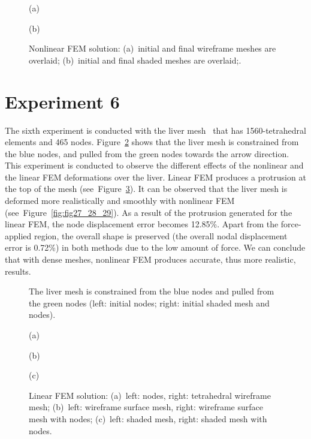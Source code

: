 \begin{figure}[h]
\centerline{}
\centerline{(a)}
\centerline{}
\centerline{(b)}
\caption{Nonlinear FEM solution: (a)~initial and final wireframe meshes are overlaid; (b)~initial and final shaded meshes are overlaid;.}
\label{fig:fig21_22}
\end{figure}

\clearpage
\section{Experiment 6}
\label{vi}

The sixth experiment is conducted with the liver mesh~\cite{Liver2011} that has 1560-tetrahedral elements and 465 nodes. Figure~\ref{fig:fig23} shows that the liver mesh is constrained from the blue nodes, and pulled from the green nodes towards the arrow direction. This experiment is conducted to observe the different effects of the nonlinear and the linear FEM deformations over the liver. Linear FEM produces a protrusion at the top of the mesh (see~Figure~\ref{fig:fig24_25_26}). It can be observed that the liver mesh is deformed more realistically and smoothly with nonlinear FEM (see~Figure~\ref{fig:fig27_28_29}). As a result of the protrusion generated for the linear FEM, the node displacement error becomes 12.85\%. Apart from the force-applied region, the overall shape is preserved (the overall nodal displacement error is 0.72\%) in both methods due to the low amount of force. We can conclude that with dense meshes, nonlinear FEM produces accurate, thus more realistic, results.


\begin{figure}[h]
\centerline{}
\caption{The liver mesh is constrained from the blue nodes and pulled from the green nodes (left: initial nodes; right: initial shaded mesh and nodes).}
\label{fig:fig23}
\end{figure}

\begin{figure}[h]
\centerline{}
\centerline{(a)}
\centerline{}
\centerline{(b)}
\centerline{}
\centerline{(c)}
\caption{Linear FEM solution: (a)~left: nodes, right: tetrahedral wireframe mesh;
                              (b)~left: wireframe surface mesh, right: wireframe surface mesh with nodes;
                              (c)~left: shaded mesh, right: shaded mesh with nodes.}
\label{fig:fig24_25_26}
\end{figure}

